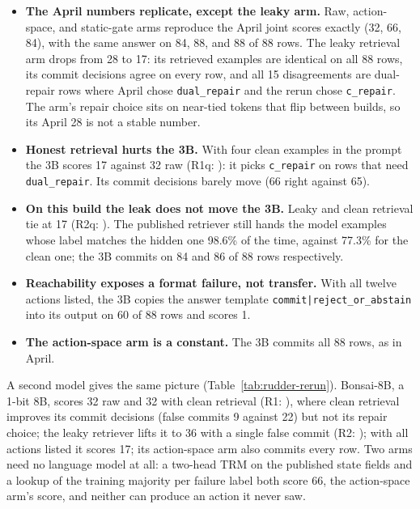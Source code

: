 \documentclass[11pt]{article}
\begin{document}
\begin{itemize}[leftmargin=*]
  \item \textbf{The April numbers replicate, except the leaky arm.} Raw, action-space, and static-gate arms reproduce the April joint scores exactly (32, 66, 84), with the same answer on 84, 88, and 88 of 88 rows. The leaky retrieval arm drops from 28 to 17: its retrieved examples are identical on all 88 rows, its commit decisions agree on every row, and all 15 disagreements are dual-repair rows where April chose \texttt{dual\_repair} and the rerun chose \texttt{c\_repair}. The arm's repair choice sits on near-tied tokens that flip between builds, so its April 28 is not a stable number.
  \item \textbf{Honest retrieval hurts the 3B.} With four clean examples in the prompt the 3B scores 17 against 32 raw (R1q: \testRoneq): it picks \texttt{c\_repair} on rows that need \texttt{dual\_repair}. Its commit decisions barely move (66 right against 65).
  \item \textbf{On this build the leak does not move the 3B.} Leaky and clean retrieval tie at 17 (R2q: \testRtwoq). The published retriever still hands the model examples whose label matches the hidden one 98.6\% of the time, against 77.3\% for the clean one; the 3B commits on 84 and 86 of 88 rows respectively.
  \item \textbf{Reachability exposes a format failure, not transfer.} With all twelve actions listed, the 3B copies the answer template \texttt{commit|reject\_or\_abstain} into its output on 60 of 88 rows and scores 1.
  \item \textbf{The action-space arm is a constant.} The 3B commits all 88 rows, as in April.
\end{itemize}

A second model gives the same picture (Table~\ref{tab:rudder-rerun}). Bonsai-8B, a 1-bit 8B, scores 32 raw and 32 with clean retrieval (R1: \testRone), where clean retrieval improves its commit decisions (false commits 9 against 22) but not its repair choice; the leaky retriever lifts it to 36 with a single false commit (R2: \testRtwo); with all actions listed it scores 17; its action-space arm also commits every row. Two arms need no language model at all: a two-head TRM on the published state fields and a lookup of the training majority per failure label both score 66, the action-space arm's score, and neither can produce an action it never saw.

\begin{table}[t]
  \centering
  \small
  \resizebox{\linewidth}{!}{}
  \caption{The rudder benchmark with a second model, Bonsai-8B, through the same prompt builders; the last two rows use no language model.}
  \label{tab:rudder-rerun}
\end{table}
\end{document}
